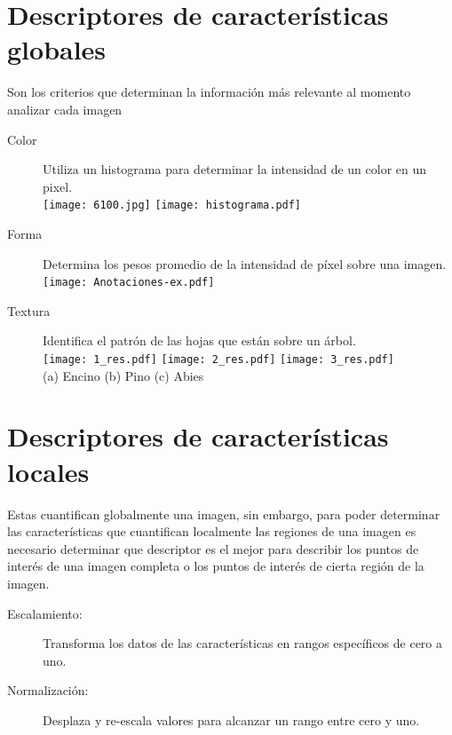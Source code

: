 \documentclass[a0,portrait]{a0poster}
\begin{document}
\begin{multicols}{2}
\section*{Descriptores de características globales}
Son los criterios que determinan la información más relevante al momento analizar cada imagen
\begin{description}

\item[Color]{Utiliza un histograma para determinar la intensidad de un color en un pixel.}\\

\hspace*{50mm}\texttt{[image: 6100.jpg]}
   \texttt{[image: histograma.pdf]}
\item[Forma]{Determina los pesos promedio de la intensidad de píxel sobre una imagen.}\\

   \hspace*{80mm}\texttt{[image: Anotaciones-ex.pdf]}
   
\item[Textura]{Identifica el patrón de las hojas que están sobre un árbol.}\\

\hspace*{25mm}\texttt{[image: 1\_res.pdf]}
\texttt{[image: 2\_res.pdf]}
\texttt{[image: 3\_res.pdf]}\\
\hspace*{50mm}(a) Encino \hspace*{40mm} (b) Pino \hspace*{30mm} (c) Abies
\end{description}

\section*{Descriptores de características locales}
Estas cuantifican globalmente una imagen, sin embargo, para poder determinar las características que cuantifican localmente las regiones de una imagen es necesario determinar que descriptor es el mejor para describir los puntos de interés de una imagen completa o los puntos de interés de cierta región de la imagen.

\begin{description}
\item[Escalamiento:]{Transforma los datos de las características en rangos específicos de cero a uno.}
\item[Normalización:]{Desplaza y re-escala valores para alcanzar un rango entre cero y uno.}


\end{description}
\end{multicols}
\end{document}
